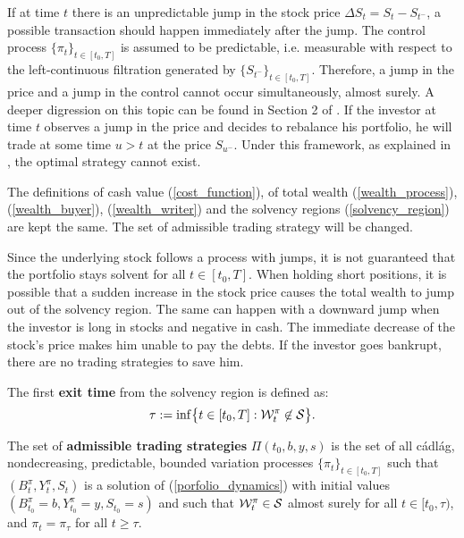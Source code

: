 If at time $t$ there is an unpredictable jump in the stock price $\Delta S_t = S_t - S_{t^-}$, a possible transaction should happen immediately after the jump.
The control process $\{\pi_t\}_{t \in [t_0,T]}$ is assumed to be predictable, i.e. measurable with respect to the left-continuous filtration generated by $\{S_{t^-}\}_{t \in [t_0,T]}$.
Therefore, a jump in the price and a jump in the control cannot occur simultaneously, almost surely. 
A deeper digression on this topic can be found in Section 2 of \cite{Kab16}.   
If the investor at time $t$ observes a jump in the price and decides to rebalance his portfolio, he will trade at some time $u>t$ at the price $S_{u^-}$. 
Under this framework, as explained in \cite{Kab16}, the optimal strategy cannot exist. 

The definitions of cash value (\ref{cost_function}), of total wealth (\ref{wealth_process}), (\ref{wealth_buyer}), (\ref{wealth_writer}) and the solvency regions
(\ref{solvency_region}) are kept the same. The set of admissible trading strategy will be changed.

Since the underlying stock follows a process with jumps, it is not guaranteed that the portfolio stays
solvent for all $t \in [t_0,T]$. When holding short positions, it is possible that a sudden increase in the stock price 
causes the total wealth to jump out of the solvency region. 
The same can happen with a downward jump when the investor is long in stocks and negative in cash. 
The immediate decrease of the stock's price makes him unable to pay the debts.
If the investor goes bankrupt, there are no trading strategies to save him.
\begin{Definition}
The first \textbf{exit time} from the solvency region is defined as:
\begin{equation}\label{exit_time}
 \tau := \inf \bigl\{ t \in [t_0,T] : \mathcal{W}^{\pi}_t \not\in \mathcal{S} \bigr\}.
\end{equation} 
\end{Definition}
\begin{Definition}\label{set_trad_strat}
The set of \textbf{admissible trading strategies} $\Pi(t_0,b,y,s)$   
is the set of all cádlág, nondecreasing, predictable, bounded variation processes $\{\pi_t\}_{t \in [t_0,T]}$
such that $(B^\pi_t,Y^\pi_t,S_t)$ is a solution of (\ref{porfolio_dynamics}) with initial values $(B^\pi_{t_0} = b, Y^\pi_{t_0} = y, S_{t_0} = s)$ and such that
$\mathcal{W}^{\pi}_t \in \mathcal{S}$ almost surely for all $t\in [t_0,\tau)$, and $\pi_t = \pi_{\tau}$ for all $t \geq \tau$.  
\end{Definition}

